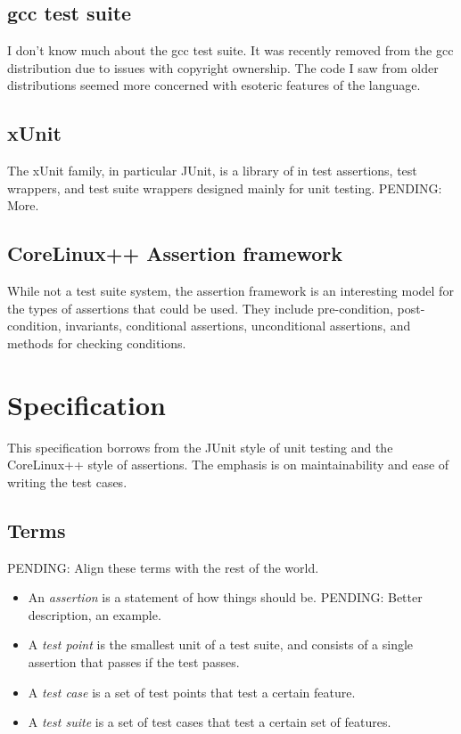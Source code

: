 \documentclass{widearticle}
\begin{document}
\subsection{gcc test suite}
I don't know much about the gcc test suite.  It was recently removed
from the gcc distribution due to issues with copyright ownership.  The
code I saw from older distributions seemed more concerned with
esoteric features of the language.

\subsection{xUnit}
The xUnit family, in particular JUnit, is a library of in test
assertions, test wrappers, and test suite wrappers designed mainly for
unit testing.  PENDING: More.

\subsection{CoreLinux++ Assertion framework}
While not a test suite system, the assertion framework is an
interesting model for the types of assertions that could be used.
They include pre-condition, post-condition, invariants, conditional
assertions, unconditional assertions, and methods for checking
conditions.

\section{Specification}
This specification borrows from the JUnit style of unit testing and
the CoreLinux++ style of assertions.  The emphasis is on
maintainability and ease of writing the test cases.

\subsection{Terms}
PENDING: Align these terms with the rest of the world.

\begin{itemize}
    \item An \emph{assertion} is a statement of how things should be.
PENDING: Better description, an example.
    \item A \emph{test point} is the smallest unit of a test suite,
and consists of a single assertion that passes if the test passes.
    \item A \emph{test case} is a set of test points that test a
certain feature.
    \item A \emph{test suite} is a set of test cases that test a
certain set of features.
\end{itemize}
\end{document}
